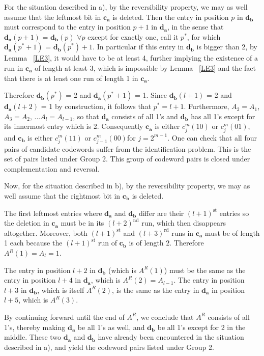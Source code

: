 For the situation described in a), by the reversibility property,
we may as well assume that the leftmost bit in $\mathbf{c_a}$ is
deleted. Then the entry in position $p$ in $\mathbf{d_b}$ must
correspond to the entry in position $p+1$ in $\mathbf{d_a}$, in
the sense that $\mathbf{d_a}(p+1)$ = $\mathbf{d_b}(p)$ $\forall p$
except for exactly one, call it $p^*$, for which
$\mathbf{d_a}(p^*+1)$ = $\mathbf{d_b}(p^*)+1$. In particular if
this entry in $\mathbf{d_b}$ is bigger than 2, by Lemma
~\ref{LE3}, it would have to be at least 4, further implying the
existence of a run in $\mathbf{c_a}$ of length at least 3, which
is impossible by Lemma ~\ref{LE3} and the fact that there is at
least one run of length 1 in $\mathbf{c_a}$.

Therefore $\mathbf{d_b}(p^*)$ = 2 and $\mathbf{d_a}(p^*+1)$ = 1.
Since $\mathbf{d_b}(l+1)$ = 2 and $\mathbf{d_a}(l+2)$ = 1 by
construction, it follows that $p^*=l+1$. Furthermore, $A_2=A_1$,
$A_3=A_2$, ...$A_l=A_{l-1}$, so that $\mathbf{d_a}$ consists of
all 1's and $\mathbf{d_b}$ has all 1's except for its innermost
entry which is 2. Consequently $\mathbf{c_a}$ is either
$c_j^m(10)$ or $c_j^m(01)$, and $\mathbf{c_b}$ is either
$c_j^m(11)$ or $c_{j-1}^m(00)$for $j=2^{m-1}$.
One can check that all four pairs of candidate
codewords suffer from the identification
problem. This is the set of pairs listed under Group 2.
This group of codeword pairs is closed under complementation and reversal.

Now, for the situation described in b), by the
reversibility property, we may as well assume that the rightmost bit
in $\mathbf{c_b}$ is
deleted.

The first leftmost entries where $\mathbf{d_a}$ and $\mathbf{d_b}$
differ are their $(l+1)^{\text{st}}$ entries so the deletion in
$\mathbf{c_a}$ must be in its $(l+2)^{\text{nd}}$ run, which then
disappears altogether. Moreover, both $(l+1)^{\text{st}}$ and
$(l+3)^{\text{rd}}$ runs in $\mathbf{c_a}$ must be of length 1
each because the $(l+1)^{\text{st}}$ run of $\mathbf{c_b}$ is of
length $2$. Therefore $A^R(1)=A_l=1$.

The entry in position $l+2$ in $\mathbf{d_b}$ (which is $A^R(1)$)
must be the same as the entry in position $l+4$ in $\mathbf{d_a}$,
which is $A^R(2)=A_{l-1}$. The entry in position $l+3$ in
$\mathbf{d_b}$, which is itself $A^R(2)$, is the same as the entry
in $\mathbf{d_a}$ in position $l+5$, which is $A^R(3)$.

By continuing forward until the end of $A^R$, we conclude that
$A^R$ consists of all 1's, thereby making $\mathbf{d_a}$ be all
1's as well, and $\mathbf{d_b}$ be all 1's except for 2 in the
middle. These two $\mathbf{d_a}$ and $\mathbf{d_b}$ have already
been encountered in the situation described in a), and yield
the codeword pairs listed under Group 2.

